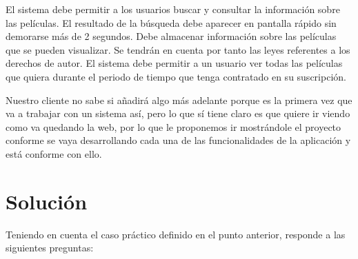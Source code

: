 El sistema debe permitir a los usuarios buscar y consultar la información sobre las películas. El resultado de la búsqueda debe aparecer en pantalla rápido sin demorarse más de 2 segundos. Debe almacenar información sobre las películas que se pueden visualizar. Se tendrán en cuenta por tanto las leyes referentes a los derechos de autor.  El sistema debe permitir a un usuario ver todas las películas que quiera durante el periodo de tiempo que tenga contratado en su suscripción.

Nuestro cliente no sabe si añadirá algo más adelante porque es la primera vez que va a trabajar con un sistema así, pero lo que sí tiene claro es que quiere ir viendo como va quedando la web, por lo que le proponemos ir mostrándole el proyecto conforme se vaya desarrollando cada una de las funcionalidades de la aplicación y está conforme con ello.

\section{Solución}
Teniendo en cuenta el caso práctico definido en el punto anterior, responde a las siguientes preguntas:

